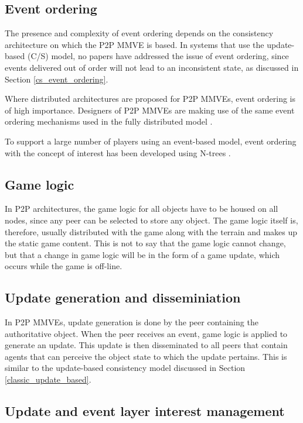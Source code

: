 \subsection{Event ordering}

The presence and complexity of event ordering depends on the consistency architecture on which the P2P MMVE is based. In systems that use the update-based (C/S) model, no papers have addressed the issue of event ordering, since events delivered out of order will not lead to an inconsistent state, as discussed in Section \ref{cs_event_ordering}.

Where distributed architectures are proposed for P2P MMVEs, event ordering is of high importance. Designers of P2P MMVEs are making use of the same event ordering mechanisms used in the fully distributed model \cite{hybrid_storage1}.

To support a large number of players using an event-based model, event ordering with the concept of interest has been developed using N-trees \cite{GauthierDickey_ntrees}.

\subsection{Game logic}

In P2P architectures, the game logic for all objects have to be housed on all nodes, since any peer can be selected to store any object. The game logic itself is, therefore, usually distributed with the game along with the terrain and makes up the static game content. This is not to say that the game logic cannot change, but that a change in game logic will be in the form of a game update, which occurs while the game is off-line.

\subsection{Update generation and disseminiation}

In P2P MMVEs, update generation is done by the peer containing the authoritative object. When the peer receives an event, game logic is applied to generate an update. This update is then disseminated to all peers that contain agents that can perceive the object state to which the update pertains. This is similar to the update-based consistency model discussed in Section \ref{classic_update_based}.

\subsection{Update and event layer interest management}
\label{key_challenges_im}

